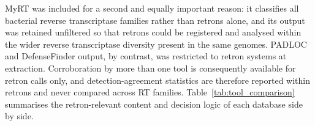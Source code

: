 MyRT was included for a second and equally important reason: it classifies all
bacterial reverse transcriptase families rather than retrons alone, and its output
was retained unfiltered so that retrons could be registered and analysed within the
wider reverse transcriptase diversity present in the same genomes. PADLOC and
DefenseFinder output, by contrast, was restricted to retron systems at extraction.
Corroboration by more than one tool is consequently available for retron calls only,
and detection-agreement statistics are therefore reported within retrons and never
compared across RT families. Table~\ref{tab:tool_comparison} summarises the
retron-relevant content and decision logic of each database side by side.




